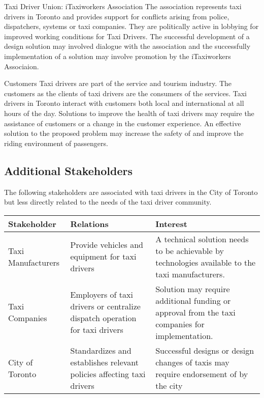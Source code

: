 \documentclass[11pt]{article}
\begin{document}
Taxi Driver Union: iTaxiworkers Association 
The association represents taxi drivers in Toronto and provides 
support for conflicts arising from police, dispatchers, systems or 
taxi companies. They are politically active in lobbying for improved 
working conditions for Taxi Drivers. The successful development of a 
design solution may involved dialogue with the association and the 
successfully implementation of a solution may involve promotion by the 
iTaxiworkers Associaion\cite{itaxi}. 

Customers 
Taxi drivers are part of the service and tourism industry. The customers 
as the clients of taxi drivers are the consumers of the services. Taxi 
drivers in Toronto interact with customers both local and international 
at all hours of the day. Solutions to improve the health of taxi drivers 
may require the assistance of customers or a change in the customer 
experience. An effective solution to the proposed problem may increase 
the safety of and improve the riding environment of passengers. 
 
\subsection{Additional Stakeholders}

The following stakeholders are associated with taxi drivers in the City 
of Toronto but less directly related to the needs of the taxi driver 
community. 

\begin{center}
    \begin{tabular}{ l p{5cm} p{5cm}}
    Stakeholder & Relations &	Interest \\ \hline
    Taxi Manufacturers & Provide vehicles and equipment for taxi drivers	& 
    A technical solution needs to be achievable by technologies available 
    to the taxi manufacturers. \\ 
    Taxi Companies & Employers of taxi drivers or centralize dispatch 
    operation for taxi drivers	& Solution may require additional funding 
    or approval from the taxi companies for implementation. \\
    City of Toronto & Standardizes and establishes relevant policies 
    affecting taxi drivers \cite{CityofToronto}	& Successful designs or design changes of  
    taxis may require endorsement of by the city  \\
    \end{tabular}
\end{center}
\end{document}
